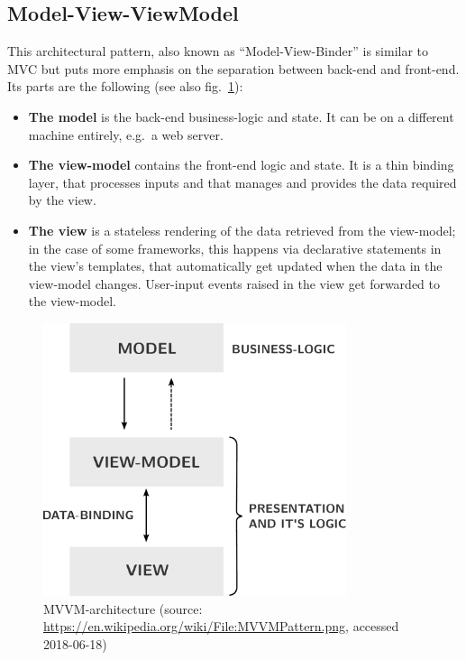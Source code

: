 \documentclass[a4paper,,tablecaptionabove]{scrbook}
\providecommand{\tightlist}{%
  \setlength{\itemsep}{0pt}\setlength{\parskip}{0pt}}
\begin{document}
\hypertarget{sec:mvvm}{%
\subsection{Model-View-ViewModel}\label{sec:mvvm}}

This architectural pattern, also known as \enquote{Model-View-Binder} is
similar to MVC but puts more emphasis on the separation between back-end
and front-end. Its parts are the following (see also
fig.~\ref{fig:mvvm}):

\begin{itemize}
\tightlist
\item
  \textbf{The model} is the back-end business-logic and state. It can be
  on a different machine entirely, e.g.~a web server.
\item
  \textbf{The view-model} contains the front-end logic and state. It is
  a thin binding layer, that processes inputs and that manages and
  provides the data required by the view.
\item
  \textbf{The view} is a stateless rendering of the data retrieved from
  the view-model; in the case of some frameworks, this happens via
  declarative statements in the view's templates, that automatically get
  updated when the data in the view-model changes. User-input events
  raised in the view get forwarded to the view-model.
\end{itemize}

\begin{figure}
\hypertarget{fig:mvvm}{%
\centering
\includegraphics[width=\textwidth,height=8cm]{./tex2pdf.11982/a9215b936073b90bd24770863c82edb8b1c0c75f.pdf}
\caption{MVVM-architecture (source:
\url{https://en.wikipedia.org/wiki/File:MVVMPattern.png}, accessed
2018-06-18)}\label{fig:mvvm}
}
\end{figure}
\end{document}

